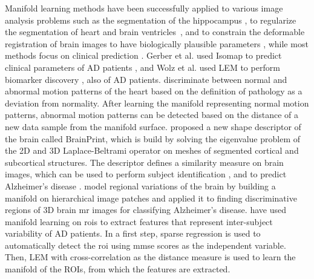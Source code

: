 Manifold learning methods have been successfully applied to various image
analysis problems such as the segmentation of the hippocampus \citep{wolz2010},
to regularize the segmentation of heart \citep{zhang2006} and brain
ventricles~\citep{etyngier2007}, and to constrain the deformable registration of
brain images to have biologically plausible parameters \citep{hamm2010}, while
most methods focus on clinical prediction
\citep{gerber2010,wolz2012,duchateau2012,aljabar2011,wachinger2015,bhatia2012,
guerrero2014}. Gerber et al. used Isomap to predict clinical parameters of AD
patients \citep{gerber2009,gerber2010}, and Wolz et al. used LEM to perform
biomarker discovery \citep{wolz2011,wolz2012}, also of AD patients.
\citet{duchateau2011,duchateau2012} discriminate between normal and abnormal
motion patterns of the heart based on the definition of pathology as a deviation
from normality. After learning the manifold representing normal motion
patterns, abnormal motion patterns can be detected based on the
distance of a new data sample from the manifold surface.
\citet{wachinger2015} proposed a new shape descriptor of the brain called
BrainPrint, which is build by solving the eigenvalue problem of the 2D and 3D
Laplace-Beltrami operator on meshes of segmented cortical and subcortical
structures. The descriptor defines a similarity measure on brain images, which
can be used to perform subject identification \citep{wachinger2014a}, and to
predict Alzheimer's disease \citep{wachinger2014b}.
\citet{bhatia2012} model regional variations of the brain by building a manifold
on hierarchical image patches and applied it to finding discriminative regions
of 3D brain \gls{mr} images for classifying Alzheimer's disease.
\citet{guerrero2014} have used manifold learning on \glspl{roi} to
extract features that represent inter-subject variability of AD patients.
In a first step, sparse regression is used to automatically detect the
\gls{roi} using \gls{mmse} scores as the independent
variable. Then, LEM with cross-correlation as the distance measure is used to
learn the manifold of the ROIs, from which the features are extracted.

